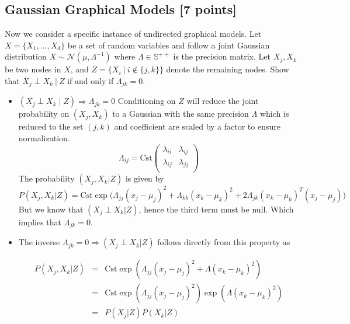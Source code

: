 \documentclass[12pt]{article}
\begin{document}
\subsection{Gaussian Graphical Models [7 points]}

Now we consider a specific instance of undirected graphical models. Let $X = \{ X_1, ..., X_d \}$ be a set of random variables and follow a joint Gaussian distribution $X \sim \mathcal{N}(\mu, \Lambda^{-1})$ where $\Lambda \in \mathbb{S}^{++}$ is the precision matrix. Let $X_j,X_k$ be two nodes in $X$, and $Z = \{X_i \ | \ i \notin \{j,k\}\}$ denote the remaining nodes. Show that $X_j \perp X_k \ | \ Z$ if and only if $\Lambda_{jk} = 0$.

\begin{solution}
  \begin{itemize}
    \item $(X_j \perp X_k\;|\;Z) \Longrightarrow
      \Lambda_{jk}=0$
      Conditioning on $Z$ will reduce the joint probability on
      $(X_j, X_k)$ to a Gaussian with the same precision $\Lambda$ which
      is reduced to the set $(j,k)$ and coefficient are scaled by a
      factor to ensure normalization.
      \[
        \Lambda_{ij}= \text{Cst} \begin{pmatrix} \lambda_{ii} &
          \lambda_{ij}\\
          \lambda_{ij} & \lambda_{jj}\\
        \end{pmatrix}
      \]
    The probability $(X_j, X_k|Z)$ is given by 
    \[
      P(X_j,X_k|Z) = \text{Cst}\exp\big(\Lambda_{jj}(x_j - \mu_j)^2 + 
      \Lambda_{kk} (x_k - \mu_k)^2
      + 2\Lambda_{jk}(x_k-\mu_k)^T(x_j-\mu_j)
    \big)
    \]
    But we know that $(X_j\perp X_k|Z)$, hence the third term must be
    null. Which implies that $\Lambda_{jk}= 0.$
  \item  The inverse $\Lambda_{jk}=0\Longrightarrow (X_j \perp X_k | Z)$
    follows directly from this property as

    \begin{eqnarray}
      P(X_j, X_k|Z) &=& \text{Cst}\exp (\Lambda_{jj}(x_j-\mu_j)^2 +
    \Lambda(x_k -\mu_k)^2) \\
                    &=&
                    \text{Cst}\exp(\Lambda_{jj}(x_j-\mu_j)^2)
                    \exp( \Lambda(x_k -\mu_k)^2)\\
                    &=& P(X_j|Z)P(X_k|Z)
  \end{eqnarray}
  \end{itemize}
\end{solution}
\end{document}
